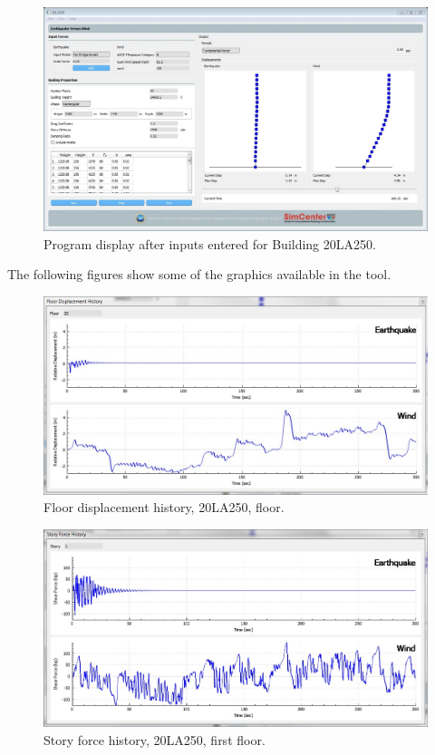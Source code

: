 \documentclass{simcenterdocumentation}
\begin{document}
\begin{figure}[H]
	\centering \includegraphics[width=0.9\linewidth]{20LA250_1.jpg}
	\caption{Program display after inputs entered for Building 20LA250.}
\end{figure}
The following figures show some of the graphics available in the tool.
\begin{figure}[H]
	\centering \includegraphics[scale=0.35]{20LA250_fdh.JPG}
	\caption{Floor displacement history, 20LA250,  floor.}
\end{figure}
\begin{figure}[H]
	\centering \includegraphics[scale=0.35]{20LA250_sfh.jpg}
	\caption{Story force history, 20LA250, first floor.}
\end{figure}
\end{document}
